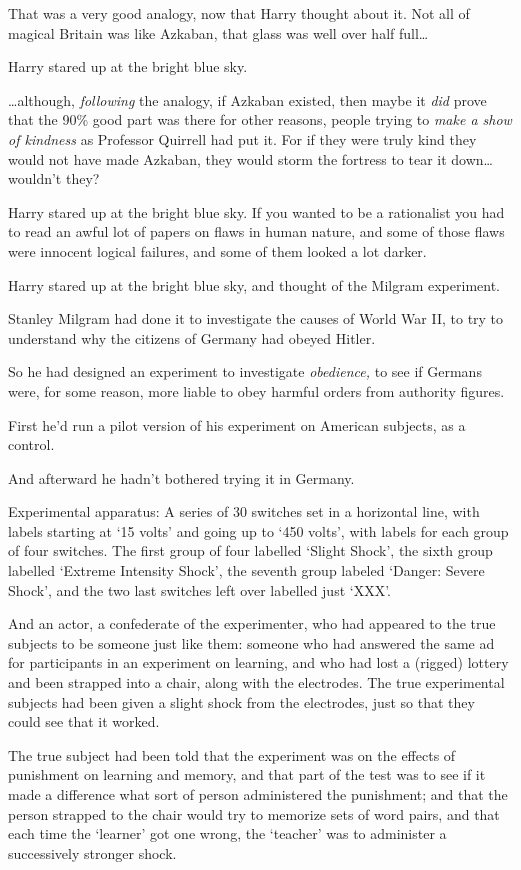 That was a very good analogy, now that Harry thought about it. Not all of magical Britain was like Azkaban, that glass was well over half full…

Harry stared up at the bright blue sky.

…although, \emph{following} the analogy, if Azkaban existed, then maybe it \emph{did} prove that the 90\% good part was there for other reasons, people trying to \emph{make a show of kindness} as Professor Quirrell had put it. For if they were truly kind they would not have made Azkaban, they would storm the fortress to tear it down…wouldn’t they?

Harry stared up at the bright blue sky. If you wanted to be a rationalist you had to read an awful lot of papers on flaws in human nature, and some of those flaws were innocent logical failures, and some of them looked a lot darker.

Harry stared up at the bright blue sky, and thought of the Milgram experiment.

Stanley Milgram had done it to investigate the causes of World War II, to try to understand why the citizens of Germany had obeyed Hitler.

So he had designed an experiment to investigate \emph{obedience,} to see if Germans were, for some reason, more liable to obey harmful orders from authority figures.

First he’d run a pilot version of his experiment on American subjects, as a control.

And afterward he hadn’t bothered trying it in Germany.

Experimental apparatus: A series of 30 switches set in a horizontal line, with labels starting at ‘15 volts’ and going up to ‘450 volts’, with labels for each group of four switches. The first group of four labelled ‘Slight Shock’, the sixth group labelled ‘Extreme Intensity Shock’, the seventh group labeled ‘Danger: Severe Shock’, and the two last switches left over labelled just ‘XXX’.

And an actor, a confederate of the experimenter, who had appeared to the true subjects to be someone just like them: someone who had answered the same ad for participants in an experiment on learning, and who had lost a (rigged) lottery and been strapped into a chair, along with the electrodes. The true experimental subjects had been given a slight shock from the electrodes, just so that they could see that it worked.

The true subject had been told that the experiment was on the effects of punishment on learning and memory, and that part of the test was to see if it made a difference what sort of person administered the punishment; and that the person strapped to the chair would try to memorize sets of word pairs, and that each time the ‘learner’ got one wrong, the ‘teacher’ was to administer a successively stronger shock.

